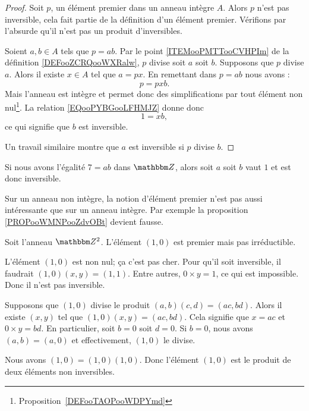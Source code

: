 \begin{proof}
    Soit \( p\), un élément premier dans un anneau intègre \( A\). Alors  \( p\) n'est pas inversible, cela fait partie de la définition d'un élément premier. Vérifions par l'absurde qu'il n'est pas un produit d'inversibles.
    
    Soient \( a,b\in A\) tels que \( p=ab\). Par le point \ref{ITEMooPMTTooCVHPIm} de la définition \ref{DEFooZCRQooWXRalw}, \( p\) divise soit \( a\) soit \( b\). Supposons que \( p\) divise \( a\). Alors il existe \( x\in A\) tel que \( a=px\). En remettant dans \( p=ab\) nous avons :
            \begin{equation}        \label{EQooPYBGooLFHMJZ}
                p=pxb.
            \end{equation}
            Mais l'anneau est intègre et permet donc des simplifications par tout élément non nul\footnote{Proposition~\ref{DEFooTAOPooWDPYmd}}. La relation \ref{EQooPYBGooLFHMJZ} donne donc 
            \begin{equation}
                1=xb,
            \end{equation}
            ce qui signifie que \( b\) est inversible.

            Un travail similaire montre que \( a\) est inversible si \( p\) divise \( b\).
\end{proof}

\begin{example}
    Si nous avons l'égalité \( 7=ab\) dans \( \eZ\), alors soit \( a\) soit \( b\) vaut \( 1\) et est donc inversible.
\end{example}

Sur un anneau non intègre, la notion d'élément premier n'est pas aussi intéressante que sur un anneau intègre. Par exemple la proposition \ref{PROPooWMNPooZdvOBt} devient fausse.

\begin{example}     \label{EXooEIUEooCZCPMC}
    Soit l'anneau \( \eZ^2\). L'élément \( (1,0)\) est premier mais pas irréductible.
    \begin{subproof}
        \item[\( (1,0)\) est premier]
            L'élément \( (1,0)\) est non nul; ça c'est pas cher. Pour qu'il soit inversible, il faudrait \( (1,0)(x,y)=(1,1)\). Entre autres, \( 0\times y=1\), ce qui est impossible. Donc il n'est pas inversible.

            Supposons que \( (1,0)\) divise le produit \( (a,b)(c,d)=(ac,bd)\). Alors il existe \( (x,y)\) tel que \( (1,0)(x,y)=(ac,bd)\). Cela signifie que \( x=ac\) et \( 0\times y=bd\). En particulier, soit \( b=0\) soit \( d=0\). Si \( b=0\), nous avons \( (a,b)=(a,0)\) et effectivement, \( (1,0)\) le divise.
        \item[\( (1,0)\) n'est pas irréductible]
            Nous avons \( (1,0)=(1,0)(1,0)\). Donc l'élément \( (1,0)\) est le produit de deux éléments non inversibles.
    \end{subproof}
\end{example}

